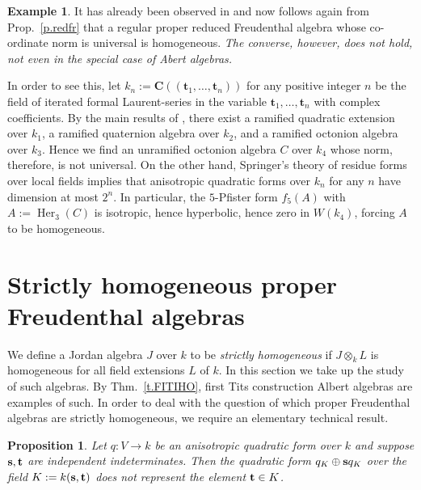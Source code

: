 \documentclass{amsart}
\newtheorem{prop}[equation]{Proposition}
\theoremstyle{definition} %
\newtheorem{eg}[equation]{Example}
\theoremstyle{remark} %
\newcommand{\bft}{\mathbf{t}}
\newcommand{\bfC}{\mathbf{C}}
\renewcommand{\:}{\colon\,}
\DeclareMathOperator{\Her}{Her}
\numberwithin{equation}{section}
\begin{document}
\begin{eg} \label{e.redal} It has already been observed in \cite{MR734841} and now follows again from Prop.~\ref{p.redfr} that a regular proper reduced Freudenthal algebra whose co-ordinate norm is universal is homogeneous. \emph{The converse, however, does not hold, not even in the special case of Abert algebras.}	
	
In order to see this, let $k_n := \bfC((\bft_1,\dots,\bft_n))$ for any positive integer $n$ be the field of iterated formal Laurent-series in the variable $\bft_1,\dots,\bft_n$ with complex coefficients.  By the main results of \cite{MR364380}, there exist a ramified quadratic extension over $k_1$, a ramified quaternion algebra over $k_2$, and a ramified octonion algebra over $k_3$. Hence we find an unramified octonion algebra $C$ over $k_4$ whose norm, therefore, is not universal. On the other hand, Springer's theory \cite{MR70664} of residue forms over local fields implies that anisotropic quadratic forms over $k_n$ for any $n$ have dimension at most $2^n$. In particular, the $5$-Pfister form $f_5(A)$ with $A := \Her_3(C)$ is isotropic, hence hyperbolic, hence zero in $W(k_4)$, forcing $A$ to be homogeneous.
\end{eg}

\section{Strictly homogeneous proper Freudenthal algebras} \label{stricthom}
We define a Jordan algebra $J$ over $k$ to be \emph{strictly homogeneous} if $J\otimes_kL$ is homogeneous for all field extensions $L$ of $k$. In this section we take up the study of such algebras. By Thm.~\ref{t.FITIHO}, first Tits construction Albert algebras are examples of such. In order to deal with the question of which proper Freudenthal algebras are strictly homogeneous, we require an elementary technical result.

\begin{prop}\label{key}
	Let $q:V \to k$ be an anisotropic quadratic form over $k$ and suppose ${\bf s},{\bf t}$	are independent indeterminates. Then the quadratic form $q_K \oplus {\bf s} q_K$ over the field $K := k({\bf s},{\bf t})$ does not represent the element ${\bf t} \in K$.
\end{prop}
\end{document}
